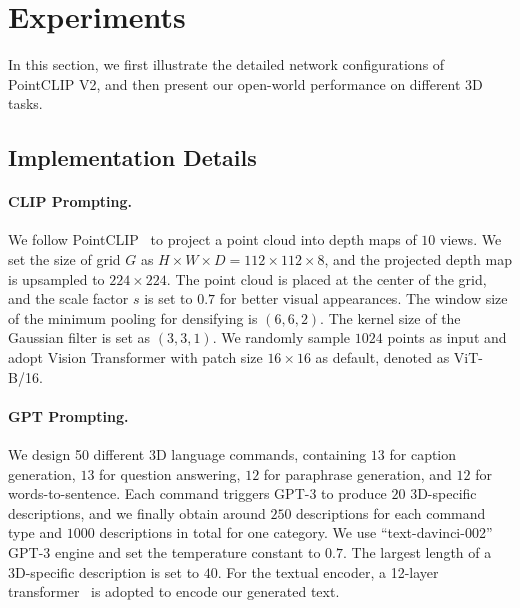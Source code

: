 \documentclass[10pt,twocolumn,letterpaper]{article}
\begin{document}
\section{Experiments}
\label{sec:experiments}

In this section, we first illustrate the detailed network configurations of PointCLIP V2, and then present our open-world performance on different 3D tasks.

\subsection{Implementation Details}
\paragraph{CLIP Prompting.} 
We follow PointCLIP~\cite{zhang2022pointclip} to project a point cloud into depth maps of $10$ views. We set the size of grid $G$ as $H \times W \times D = 112 \times 112 \times 8$, and the projected depth map is upsampled to $224 \times 224$. The point cloud is placed at the center of the grid, and the scale factor $s$ is set to $0.7$ for better visual appearances. The window size of the minimum pooling for densifying is $(6, 6, 2)$. The kernel size of the Gaussian filter is set as $(3, 3, 1)$. We randomly sample $1024$ points as input and adopt Vision Transformer \cite{dosovitskiy2020image} with patch size $16\times 16$ as default, denoted as ViT-B/16. 

\vspace{-0.1cm}
\paragraph{GPT Prompting.} 
We design 50 different 3D language commands, containing $13$ for caption generation, $13$ for question answering, $12$ for paraphrase generation, and $12$ for words-to-sentence. Each command triggers GPT-3 to produce $20$ 3D-specific descriptions, and we finally obtain around $250$ descriptions for each command type and $1000$ descriptions in total for one category. We use ``text-davinci-002'' GPT-3 engine and set the temperature constant to $0.7$. The largest length of a 3D-specific description is set to $40$. For the textual encoder, a 12-layer transformer~\cite{vaswani2017attention} is adopted to encode our generated text.
\end{document}
